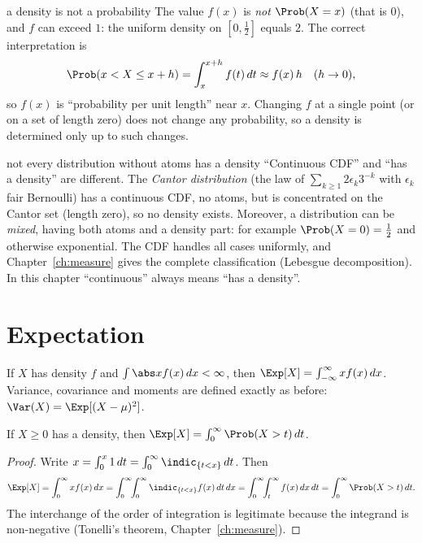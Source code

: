 \begin{nuance}{a density is not a probability}
The value $f(x)$ is \emph{not} $\Prob(X=x)$ (that is $0$), and $f$ can exceed $1$:
the uniform density on $[0,\tfrac12]$ equals $2$. The correct interpretation is
\[
\Prob(x<X\le x+h)=\int_x^{x+h}f(t)\,dt\approx f(x)\,h\quad(h\to0),
\]
so $f(x)$ is ``probability per unit length'' near $x$. Changing $f$ at a single
point (or on a set of length zero) does not change any probability, so a density
is determined only up to such changes.
\end{nuance}

\begin{nuance}{not every distribution without atoms has a density}
``Continuous CDF'' and ``has a density'' are different. The \emph{Cantor
distribution} (the law of $\sum_{k\ge1}2\epsilon_k3^{-k}$ with $\epsilon_k$ fair
Bernoulli) has a continuous CDF, no atoms, but is concentrated on the Cantor set
(length zero), so no density exists. Moreover, a distribution can be \emph{mixed},
having both atoms and a density part: for example $\Prob(X=0)=\tfrac12$ and
otherwise exponential. The CDF handles all cases uniformly, and
Chapter~\ref{ch:measure} gives the complete classification (Lebesgue
decomposition). In this chapter ``continuous'' always means ``has a density''.
\end{nuance}

\section{Expectation}

\begin{definition}[Expectation]
If $X$ has density $f$ and $\int\abs xf(x)\,dx<\infty$, then
$\Exp[X]=\int_{-\infty}^\infty xf(x)\,dx$. Variance, covariance and moments are
defined exactly as before: $\Var(X)=\Exp[(X-\mu)^2]$.
\end{definition}

\begin{theorem}\label{thm:tailint}
If $X\ge0$ has a density, then $\Exp[X]=\int_0^\infty\Prob(X>t)\,dt$.
\end{theorem}
\begin{proof}
Write $x=\int_0^x1\,dt=\int_0^\infty\indic_{\{t<x\}}\,dt$. Then
\[
\Exp[X]=\int_0^\infty x f(x)\,dx=\int_0^\infty\!\!\int_0^\infty\indic_{\{t<x\}}f(x)\,dt\,dx
=\int_0^\infty\!\!\int_t^\infty f(x)\,dx\,dt=\int_0^\infty\Prob(X>t)\,dt.
\]
The interchange of the order of integration is legitimate because the integrand
is non-negative (Tonelli's theorem, Chapter~\ref{ch:measure}).
\end{proof}

